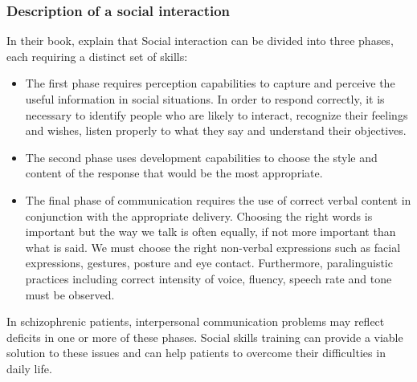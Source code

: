 \documentclass[11pt]{article}
\begin{document}
\subsubsection{Description of a social interaction}
In their book, \citeauthor{Liberman05} explain that Social interaction can be divided into three phases, each requiring a distinct set of skills:
\begin{itemize}
\item The first phase requires perception capabilities to capture and perceive the useful information in social situations. In order to respond correctly, it is necessary to identify people who are likely to interact, recognize their feelings and wishes, listen properly to what they say and understand their objectives.
\item The second phase uses development capabilities to choose the style and content of the response that would be the most appropriate.
\item The final phase of communication requires the use of correct verbal content in conjunction with the appropriate delivery. Choosing the right words is important but the way we talk is often equally, if not more important than what is said. We must choose the right non-verbal expressions such as facial expressions, gestures, posture and eye contact. Furthermore, paralinguistic practices including correct intensity of voice, fluency, speech rate and tone must be observed.
\end{itemize}
In schizophrenic patients, interpersonal communication problems may reflect deficits in one or more of these phases. Social skills training can provide a viable solution to these issues and can help patients to overcome their difficulties in daily life. 
\end{document}
